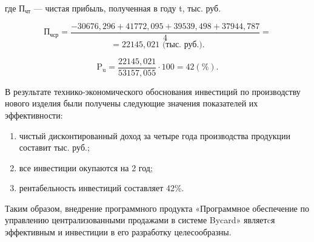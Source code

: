 где \(\text{П}_{\text{чт}}\) --- чистая прибыль, полученная в году t, тыс. руб. 

\begin{displaymath}
  \text{П}_{\text{чср}} = \frac{-30676,296+41772,095+39539,498+37944,787}{4} =
\end{displaymath}
\begin{displaymath}
  = 22145,021 \text{ (тыс. руб.)}.
\end{displaymath}

\begin{displaymath}
  \text{P}_{\text{u}} = \frac{22145,021}{53157,055}\cdot100=42(\%).
\end{displaymath}

В результате технико-экономического обоснования инвестиций по производству нового изделия были получены следующие значения показателей их эффективности:
\begin{enumerate}
    \item чистый дисконтированный доход за четыре года производства продукции составит тыс. руб.;
    \item все инвестиции окупаются на 2 год;  
    \item рентабельность инвестиций составляет 42\%.
\end{enumerate}

Таким образом, внедрение программного продукта «Программное обеспечение по управлению централизованными продажами в системе Bycard» являетcя эффективным и инвестиции в его разработку целесообразны.